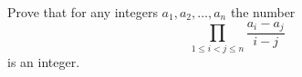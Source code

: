 Prove that for any integers $a_1,a_2,\ldots,a_n$ the number \[\prod_{1\leq i<j\leq n}\frac{a_i-a_j}{i-j}\] is an integer.